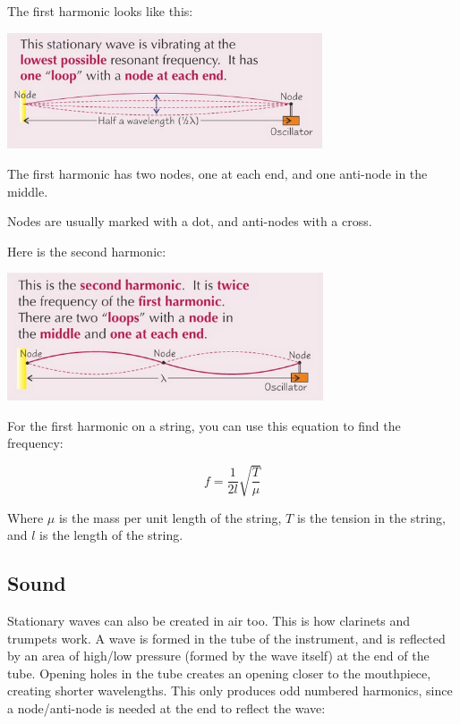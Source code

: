 \documentclass[a4paper, 12pt]{article}
\begin{document}
The first harmonic looks like this:

\begin{center}
\includegraphics[width=0.7\textwidth]{images/firstHarmonic.png}
\end{center}

The first harmonic has two nodes, one at each end, and one anti-node in the middle.

Nodes are usually marked with a dot, and anti-nodes with a cross.

Here is the second harmonic:

\begin{center}
\includegraphics[width=0.7\textwidth]{images/secondHarmonic.png}
\end{center}

For the first harmonic on a string, you can use this equation to find the frequency:

$$
f = \frac{1}{2l} \sqrt{\frac{T}{\mu}}
$$

Where $\mu$ is the mass per unit length of the string, $T$ is the tension in the string, and $l$ is the length of the string.

\subsection{Sound}

Stationary waves can also be created in air too. This is how clarinets and trumpets work. A wave is formed in the tube of the instrument, and is reflected by an area of high/low pressure (formed by the wave itself) at the end of the tube. Opening holes in the tube creates an opening closer to the mouthpiece, creating shorter wavelengths. This only produces odd numbered harmonics, since a node/anti-node is needed at the end to reflect the wave:
\end{document}
